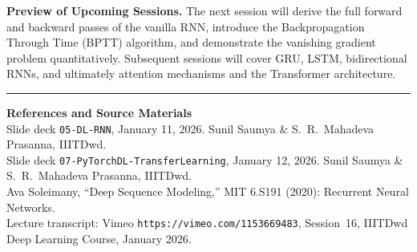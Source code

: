 \documentclass[12pt,a4paper]{article}
\begin{document}
\vspace{1.5em}
\noindent\textbf{Preview of Upcoming Sessions.}  The next session will
derive the full forward and backward passes of the vanilla RNN, introduce the
Backpropagation Through Time (BPTT) algorithm, and demonstrate the vanishing
gradient problem quantitatively.  Subsequent sessions will cover GRU, LSTM,
bidirectional RNNs, and ultimately attention mechanisms and the Transformer
architecture.

\vspace{2em}
\noindent\rule{\linewidth}{0.4pt}
\begin{small}
\noindent\textbf{References and Source Materials}\\[3pt]
Slide deck \texttt{05-DL-RNN}, January 11, 2026.
Sunil Saumya \& S.\ R.\ Mahadeva Prasanna, IIITDwd.\\[2pt]
Slide deck \texttt{07-PyTorchDL-TransferLearning}, January 12, 2026.
Sunil Saumya \& S.\ R.\ Mahadeva Prasanna, IIITDwd.\\[2pt]
Ava Soleimany, ``Deep Sequence Modeling,'' MIT 6.S191 (2020):
Recurrent Neural Networks.\\[2pt]
Lecture transcript: Vimeo \texttt{https://vimeo.com/1153669483},
Session~16, IIITDwd Deep Learning Course, January 2026.
\end{small}
\end{document}
